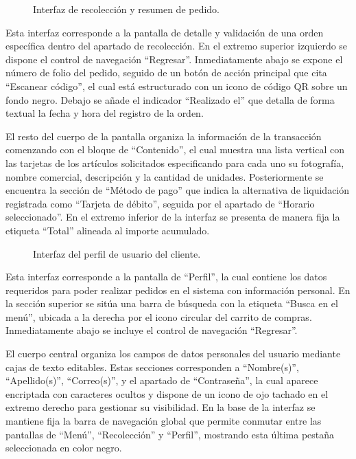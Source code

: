 \begin{figure}[H]
    \centering
    
    \caption{Interfaz de recolección y resumen de pedido.}
    \label{fig:ui-cli-14}
\end{figure}

Esta interfaz corresponde a la pantalla de detalle y validación de una orden específica dentro del apartado de recolección. En el extremo superior izquierdo se dispone el control de navegación ``Regresar''. Inmediatamente abajo se expone el número de folio del pedido, seguido de un botón de acción principal que cita ``Escanear código'', el cual está estructurado con un icono de código QR sobre un fondo negro. Debajo se añade el indicador ``Realizado el'' que detalla de forma textual la fecha y hora del registro de la orden.

El resto del cuerpo de la pantalla organiza la información de la transacción comenzando con el bloque de ``Contenido'', el cual muestra una lista vertical con las tarjetas de los artículos solicitados especificando para cada uno su fotografía, nombre comercial, descripción y la cantidad de unidades. Posteriormente se encuentra la sección de ``Método de pago'' que indica la alternativa de liquidación registrada como ``Tarjeta de débito'', seguida por el apartado de ``Horario seleccionado''. En el extremo inferior de la interfaz se presenta de manera fija la etiqueta ``Total'' alineada al importe acumulado.

\begin{figure}[H]
    \centering
    
    \caption{Interfaz del perfil de usuario del cliente.}
    \label{fig:ui-cli-15}
\end{figure}

Esta interfaz corresponde a la pantalla de ``Perfil'', la cual contiene los datos requeridos para poder realizar pedidos en el sistema con información personal. En la sección superior se sitúa una barra de búsqueda con la etiqueta ``Busca en el menú'', ubicada a la derecha por el icono circular del carrito de compras. Inmediatamente abajo se incluye el control de navegación ``Regresar''.

El cuerpo central organiza los campos de datos personales del usuario mediante cajas de texto editables. Estas secciones corresponden a ``Nombre(s)'', ``Apellido(s)'', ``Correo(s)'', y el apartado de ``Contraseña'', la cual aparece encriptada con caracteres ocultos y dispone de un icono de ojo tachado en el extremo derecho para gestionar su visibilidad. En la base de la interfaz se mantiene fija la barra de navegación global que permite conmutar entre las pantallas de ``Menú'', ``Recolección'' y ``Perfil'', mostrando esta última pestaña seleccionada en color negro.

